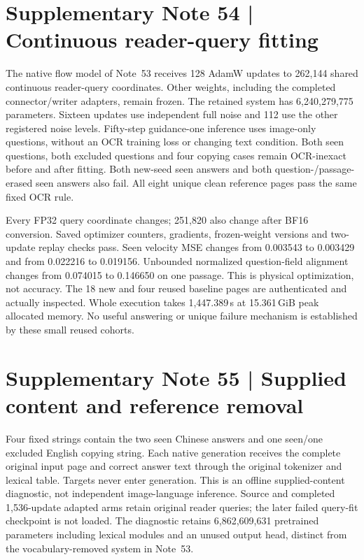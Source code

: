 \clearpage
\section*{Supplementary Note 54 | Continuous reader-query fitting}
\label{note:query-fit}
The native flow model of Note~53 receives 128 AdamW updates to 262,144 shared
continuous reader-query coordinates. Other weights, including the completed
connector/writer adapters, remain frozen. The retained system has
6,240,279,775 parameters. Sixteen updates use independent full noise and 112
use the other registered noise levels. Fifty-step guidance-one inference
uses image-only questions, without an OCR training loss or changing text
condition. Both seen questions, both excluded questions and four copying
cases remain OCR-inexact before and after fitting. Both new-seed seen answers
and both question-/passage-erased seen answers also fail. All eight unique
clean reference pages pass the same fixed OCR rule.

Every FP32 query coordinate changes; 251,820 also change after BF16
conversion. Saved optimizer counters, gradients, frozen-weight versions and
two-update replay checks pass. Seen velocity MSE changes from 0.003543 to
0.003429 and from 0.022216 to 0.019156. Unbounded normalized question-field
alignment changes from 0.074015 to 0.146650 on one passage. This is physical
optimization, not accuracy. The 18 new and four reused baseline pages are
authenticated and actually inspected. Whole execution takes 1,447.389\,s at
15.361\,GiB peak allocated memory. No useful answering or unique failure
mechanism is established by these small reused cohorts.

\section*{Supplementary Note 55 | Supplied content and reference removal}
\label{note:writer-controls}
Four fixed strings contain the two seen Chinese answers and one seen/one
excluded English copying string. Each native generation receives the complete
original input page and correct answer text through the original tokenizer
and lexical table. Targets never enter generation. This is an offline
supplied-content diagnostic, not independent image-language inference.
Source and completed 1,536-update adapted arms retain original reader queries;
the later failed query-fit checkpoint is not loaded. The diagnostic retains
6,862,609,631 pretrained parameters including lexical modules and an unused
output head, distinct from the vocabulary-removed system in Note~53.

